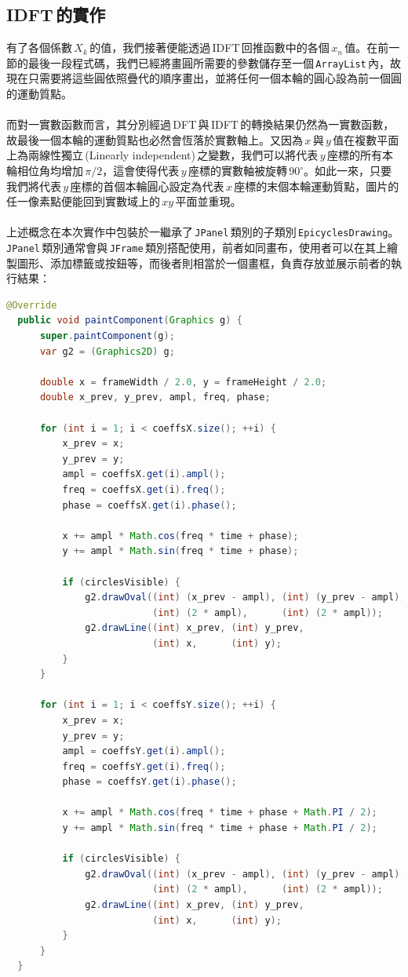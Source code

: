   \subsection{IDFT\,的實作}
  有了各個係數\,\(X_k\)\,的值，我們接著便能透過\,IDFT\,回推函數中的各個\,\(x_n\)\,值。在前一節的最後一段程式碼，我們已經將畫圓所需要的參數儲存至一個\,\texttt{ArrayList}\,內，故現在只需要將這些圓依照疊代的順序畫出，並將任何一個本輪的圓心設為前一個圓的運動質點。
  \\\\
  而對一實數函數而言，其分別經過\,DFT\,與\,IDFT\,的轉換結果仍然為一實數函數，故最後一個本輪的運動質點也必然會恆落於實數軸上。又因為\,\(x\)\,與\,\(y\)\,值在複數平面上為兩線性獨立\,(Linearly independent)\,之變數，我們可以將代表\,\(y\)\,座標的所有本輪相位角均增加\,\(\pi/2\)，這會使得代表\,\(y\)\,座標的實數軸被旋轉\,\(90^\circ\)。如此一來，只要我們將代表\,\(y\)\,座標的首個本輪圓心設定為代表\,\(x\)\,座標的末個本輪運動質點，圖片的任一像素點便能回到實數域上的\,\(xy\)\,平面並重現。
  \\\\
  上述概念在本次實作中包裝於一繼承了\,\texttt{JPanel}\,類別的子類別\,\texttt{EpicyclesDrawing}。\texttt{JPanel}\,類別通常會與\,\texttt{JFrame}\,類別搭配使用，前者如同畫布，使用者可以在其上繪製圖形、添加標籤或按鈕等，而後者則相當於一個畫框，負責存放並展示前者的執行結果：
  \begin{lstlisting}[language=Java]
  @Override
  public void paintComponent(Graphics g) {
      super.paintComponent(g);
      var g2 = (Graphics2D) g;

      double x = frameWidth / 2.0, y = frameHeight / 2.0;
      double x_prev, y_prev, ampl, freq, phase;

      for (int i = 1; i < coeffsX.size(); ++i) {
          x_prev = x;
          y_prev = y;
          ampl = coeffsX.get(i).ampl();
          freq = coeffsX.get(i).freq();
          phase = coeffsX.get(i).phase();
          
          x += ampl * Math.cos(freq * time + phase);
          y += ampl * Math.sin(freq * time + phase);
          
          if (circlesVisible) {
              g2.drawOval((int) (x_prev - ampl), (int) (y_prev - ampl),
                          (int) (2 * ampl),      (int) (2 * ampl));
              g2.drawLine((int) x_prev, (int) y_prev,
                          (int) x,      (int) y);
          }
      }
      
      for (int i = 1; i < coeffsY.size(); ++i) {
          x_prev = x;
          y_prev = y;
          ampl = coeffsY.get(i).ampl();
          freq = coeffsY.get(i).freq();
          phase = coeffsY.get(i).phase();
           
          x += ampl * Math.cos(freq * time + phase + Math.PI / 2);
          y += ampl * Math.sin(freq * time + phase + Math.PI / 2);
          
          if (circlesVisible) {
              g2.drawOval((int) (x_prev - ampl), (int) (y_prev - ampl),
                          (int) (2 * ampl),      (int) (2 * ampl));
              g2.drawLine((int) x_prev, (int) y_prev,
                          (int) x,      (int) y);
          }
      }
  }
  \end{lstlisting}
